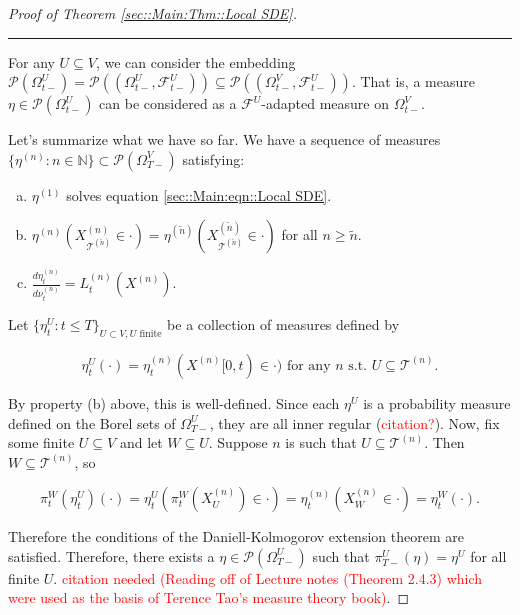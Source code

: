 \documentclass[12pt]{article}
\newcommand{\mb}{\mathbb}
\newcommand{\mc}{\mathcal}
\newcommand{\ms}{\mathscr}
\newcommand{\te}{\text}
\newcommand{\tr}{\textcolor{red}}
\newcommand{\ind}{\hspace{24pt}}
\newcommand{\lin}{\rule{\linewidth}{0.4 pt}}
\newcommand{\pmsr}{\mc{P}}							%
\renewcommand{\U}{U}							%
\newcommand{\UU}{W}								%
\newcommand{\T}{T}								%
\renewcommand{\t}{t}							%
\newcommand{\sset}{\Omega}						%
\newcommand{\proj}{\pi}							%
\renewcommand{\tt}{s}							%
\newcommand{\F}{\mc{F}}							%
\newcommand{\X}{X}								%
\newcommand{\vind}[1]{^{#1}}					%
\newcommand{\vsi}[1]{^{#1}}						%
\newcommand{\cind}[1]{_{#1}}					%
\newcommand{\tip}[1]{#1}						%
\newcommand{\ts}[1]{_{#1}}						%
\newcommand{\tree}{\mc{T}}						%
\newcommand{\sln}[1]{^{(#1)}}					%
\newcommand{\alt}[1]{\widetilde{#1}}			%
\newcommand{\mm}{\nu}							%
\newcommand{\mmm}{\eta}							%
\newcommand{\dense}{L}							%
\begin{document}
\begin{proof}[Proof of Theorem \ref{sec::Main:Thm::Local SDE}]
\lin

For any \(\U\subseteq V\), we can consider the embedding \(\pmsr\left(\sset\vsi{\U}\ts{\t-}\right) = \pmsr\left((\sset\vsi{\U}\ts{\t-},\F\vsi{\U}\ts{\t-})\right) \subseteq \pmsr\left((\sset\vsi{V}\ts{\t-},\F\vsi{\U}\ts{\t-})\right)\). That is, a measure \(\mmm\in \pmsr\left(\sset\vsi{\U}\ts{\t-}\right)\) can be considered as a \(\F\vsi{\U}\)-adapted measure on \(\sset\vsi{V}\ts{\t-}\).

\ind Let's summarize what we have so far. We have a sequence of measures \(\{\mmm\sln{n}:n\in\mb{N}\} \subset \pmsr(\sset\vsi{V}\ts{\T-})\) satisfying:

\begin{enumerate}[(a)]
\item \(\mmm\sln{1}\) solves equation \eqref{sec::Main:eqn::Local SDE}.

\item \(\mmm\sln{n}(\X\sln{n}\cind{\tree\sln{\alt{n}}} \in \cdot) = \mmm\sln{\alt{n}}(\X\sln{\alt{n}}\cind{\tree\sln{\alt{n}}}\in \cdot)\) for all \(n \geq \alt{n}\).

\item \(\frac{d\mmm\sln{n}\ts{\t}}{d\mm\sln{n}\ts{\t}} = \dense\sln{n}\ts{\t}(\X\sln{n})\).
\end{enumerate}

Let \(\{\mmm\vind{\U}\ts{\t}:\t \leq \T\}_{\U\subset V,\U\te{ finite}}\) be a collection of measures defined by

\[\mmm\vind{\U}\ts{\t}(\cdot) = \mmm\sln{n}\ts{\t}(\X\sln{n}\tip{[0,\t)} \in \cdot) \te{ for any }n\te{ \tt.\t. }\U \subseteq \tree\sln{n}.\]

By property (b) above, this is well-defined. Since each \(\mmm\vind{\U}\) is a probability measure defined on the Borel sets of \(\sset\vsi{\U}\ts{\T-}\), they are all inner regular (\tr{citation?}). Now, fix some finite \(\U\subseteq V\) and let \(\UU \subseteq \U\). Suppose \(n\) is such that \(\U \subseteq \tree\sln{n}\). Then \(\UU\subseteq \tree\sln{n}\), so

\[\proj\vsi{\UU}\ts{\t}(\mmm\vind{\U}\ts{\t})(\cdot) = \mmm\vind{\U}\ts{\t}\left(\proj\vsi{\UU}\ts{\t}(\X\sln{n}\cind{\U}) \in \cdot\right) = \mmm\sln{n}\ts{\t}\left(\X\sln{n}\cind{\UU} \in \cdot\right) = \mmm\vind{\UU}\ts{\t}(\cdot).\]

Therefore the conditions of the Daniell-Kolmogorov extension theorem are satisfied. Therefore, there exists a \(\mmm\in \ms{P}(\sset\vsi{\U}\ts{\T-})\) such that \(\proj\vsi{\U}\ts{\T-}(\mmm) =\mmm\vind{\U}\) for all finite \(\U\). \tr{citation needed (Reading off of Lecture notes (Theorem 2.4.3) which were used as the basis of Terence Tao's measure theory book)}.


\end{proof}
\end{document}
